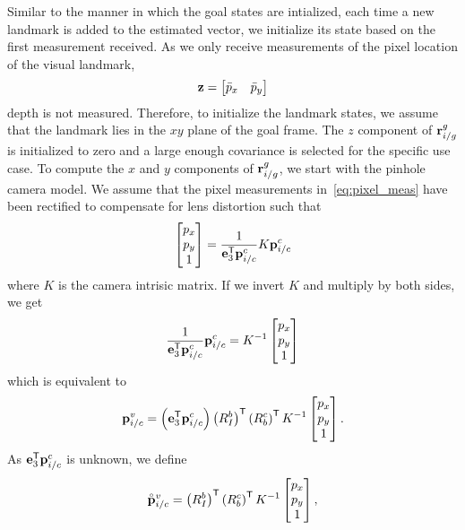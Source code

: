 Similar to the manner in which the goal states are intialized, each time a new
landmark is added to the estimated vector, we initialize its state based on the
first measurement received. As we only receive measurements of the pixel
location of the visual landmark,
\begin{equation}
  \vect{z} = \begin{bmatrix} \bar{p}_x & \bar{p}_y \end{bmatrix}
  \label{eq:pixel_meas}
\end{equation}
depth is not measured. Therefore, to initialize
the landmark states, we assume that the landmark lies in the $xy$ plane of the
goal frame. The $z$ component of $\boldsymbol{\mathrm{r}}_{i/g}^g$ is initialized to zero and a
large enough covariance is selected for the specific use case. To compute the
$x$ and $y$ components of $\boldsymbol{\mathrm{r}}_{i/g}^g$, we start with the pinhole camera
model. We assume that the pixel measurements in~\eqref{eq:pixel_meas} have been
rectified to compensate for lens distortion such that
\begin{equation}
  \begin{bmatrix}
    p_x \\ p_y \\ 1
  \end{bmatrix} = \frac{1}{\boldsymbol{\mathrm{e}}_3^{\mathsf{T}} \boldsymbol{\mathrm{p}}_{i/c}^c} K \boldsymbol{\mathrm{p}}_{i/c}^c \\
\end{equation}
where $K$ is the camera intrisic matrix. If we invert $K$ and multiply by both
sides, we get
\begin{equation}
 \frac{1}{\boldsymbol{\mathrm{e}}_3^{\mathsf{T}} \boldsymbol{\mathrm{p}}_{i/c}^c} \boldsymbol{\mathrm{p}}_{i/c}^c
  =
  K^{-1} \begin{bmatrix}
    p_x \\ p_y \\ 1
  \end{bmatrix}
\end{equation}
which is equivalent to
\begin{equation}
 \boldsymbol{\mathrm{p}}_{i/c}^v
  =
  \left( \boldsymbol{\mathrm{e}}_3^{\mathsf{T}} \boldsymbol{\mathrm{p}}_{i/c}^c \right) \left( R_I^b
  \right)^{\mathsf{T}} \left( R_b^c \right)^{\mathsf{T}} K^{-1} \begin{bmatrix}
    p_x \\ p_y \\ 1
  \end{bmatrix}.
\end{equation}
As $\boldsymbol{\mathrm{e}}_3^{\mathsf{T}} \boldsymbol{\mathrm{p}}_{i/c}^c$ is unknown, we define 
\begin{equation}
  \accentset{\circ}{\boldsymbol{\mathrm{p}}}_{i/c}^v
  =
   \left( R_I^b
  \right)^{\mathsf{T}} \left( R_b^c \right)^{\mathsf{T}} K^{-1} \begin{bmatrix}
    p_x \\ p_y \\ 1
  \end{bmatrix},
\end{equation}
